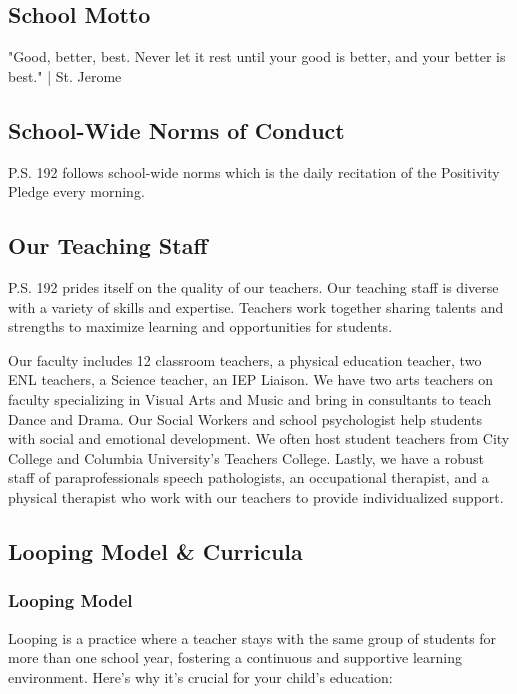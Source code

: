 \documentclass[11pt]{article}
\begin{document}
\subsection{School Motto}
\label{sec:org72be0fd}
"Good, better, best. Never let it rest until your good is better, and your better is best." | St. Jerome

\subsection{School-Wide Norms of Conduct}
\label{sec:org3f8a107}
P.S. 192 follows school-wide norms which is the daily recitation of the Positivity Pledge every morning.

\subsection{Our Teaching Staff}
\label{sec:org0ca01b5}
P.S. 192 prides itself on the quality of our teachers. Our teaching staff is diverse with a variety of skills and expertise. Teachers work together sharing talents and strengths to maximize learning and opportunities for students.

Our faculty includes 12 classroom teachers, a physical education teacher, two ENL teachers, a Science teacher, an IEP Liaison. We have two arts teachers on faculty specializing in Visual Arts and Music and bring in consultants to teach Dance and Drama. Our Social Workers and school psychologist help students with social and emotional development. We often host student teachers from City College and Columbia University’s Teachers College. Lastly, we have a robust staff of paraprofessionals speech pathologists, an occupational therapist, and a physical therapist who work with our teachers to provide individualized support.

\subsection{Looping Model \& Curricula}
\label{sec:org7e288a9}
\subsubsection{Looping Model}
\label{sec:orgc3c05fb}
Looping is a practice where a teacher stays with the same group of students for more than one school year, fostering a continuous and supportive learning environment. Here's why it's crucial for your child's education:
\end{document}
